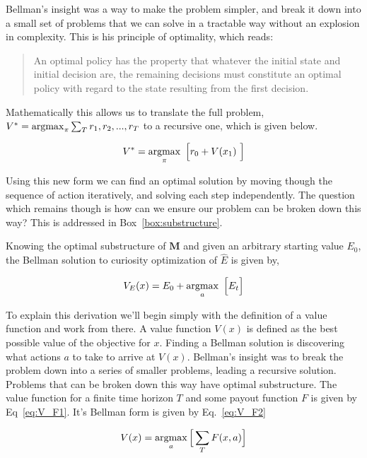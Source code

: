 Bellman's insight was a way to make the problem simpler, and break it down into a small set of problems that we can solve in a tractable way without an explosion in complexity. This is his principle of optimality, which reads:

\begin{quote}
    An optimal policy has the property that whatever the initial state and initial decision are, the remaining decisions must constitute an optimal policy with regard to the state resulting from the first decision. \citep{Bellmann1954}
\end{quote}

Mathematically this allows us to translate the full problem, $V^* = \operatorname*{argmax}_{\pi} \sum_T r_1, r_2, ..., r_{T}$ to a recursive one, which is given below. 

\begin{equation}
    V^* = \operatorname*{argmax}_{\pi} \ \Big [ r_0 + V(x_1) \ \Big ]
\end{equation}

Using this new form we can find an optimal solution by moving though the sequence of action iteratively, and solving each step independently. The question which remains though is how can we ensure our problem can be broken down this way? This is addressed in Box~\ref{box:substructure}.

Knowing the optimal substructure of $\mathbf{M}$ and given an arbitrary starting value $E_0$, the Bellman solution to curiosity optimization of $\hat E$ is given by,

\begin{equation}
	\label{eq:V_E} 
	V_E(x) = E_0 + \operatorname*{argmax}_a \ \Big [ E_t \Big ] \\
\end{equation}

To explain this derivation we'll begin simply with the definition of a value function and work from there. A value function $V(x)$ is defined as the best possible value of the objective for $x$. Finding a Bellman solution is discovering what actions $a$ to take to arrive at $V(x)$. Bellman's insight was to break the problem down into a series of smaller problems, leading a recursive solution. Problems that can be broken down this way have optimal substructure. The value function for a finite time horizon $T$ and some payout function $F$ is given by Eq~\ref{eq:V_F1}. It's Bellman form is given by Eq.~\ref{eq:V_F2}

\begin{equation}
	\label{eq:V_F1}
	V(x) = \operatorname*{argmax}_a \Big [ \sum_T F(x, a) \Big ]
\end{equation}

